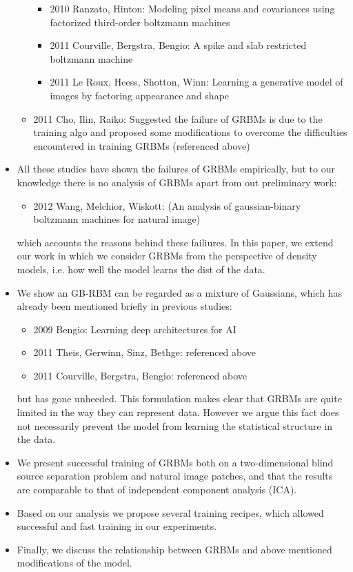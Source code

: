 \documentclass[twoside,english]{uiofysmaster}
\begin{document}
\begin{itemize}
\begin{itemize}
\begin{itemize}
			\item 2010 Ranzato, Hinton: Modeling pixel means and covariances using factorized third-order boltzmann machines \cite{Ranzato2010a}
			\item 2011 Courville, Bergstra, Bengio: A spike and slab restricted boltzmann machine \cite{Courville2011}
			\item 2011 Le Roux, Heess, Shotton, Winn: Learning a generative model of images by factoring appearance and shape \cite{LeRoux2011}
		\end{itemize}
		\item 2011 Cho, Ilin, Raiko: Suggested the failure of GRBMs is due to the training algo and proposed some modifications to overcome the difficulties encountered in training GRBMs (referenced above) \cite{Cho2011}
	\end{itemize}
	\item All these studies have shown the failures of GRBMs empirically, but to our knowledge there is no analysis of GRBMs apart from out preliminary work:
	\begin{itemize}
		\item 2012 Wang, Melchior, Wiskott: (An analysis of gaussian-binary boltzmann machines for natural image) \cite{Wang2012}
	\end{itemize}
	which accounts the reasons behind these failiures. In this paper, we extend our work in which we consider GRBMs from the perspective of density models, i.e. how well the model learns the dist of the data.
	\item We show an GB-RBM can be regarded as a mixture of Gaussians, which has already been mentioned briefly in previous studies:
	\begin{itemize}
		\item 2009 Bengio: Learning deep architectures for AI \cite{Bengio2009}
		\item 2011 Theis, Gerwinn, Sinz, Bethge: referenced above \cite{Theis2011}
		\item 2011 Courville, Bergstra, Bengio: referenced above \cite{Courville2011}
	\end{itemize}
	but has gone unheeded. This formulation makes clear that GRBMs are quite limited in the way they can represent data. However we argue this fact does not necessarily prevent the model from learning the statistical structure in the data. 
	\item We present successful training of GRBMs both on a two-dimensional blind source separation problem and natural image patches, and that the results are comparable to that of independent component analysis (ICA). 
	\item Based on our analysis we propose several training recipes, which allowed successful and fast training in our experiments. 
	\item Finally, we discuss the relationship between GRBMs and above mentioned modifications of the model.
\end{itemize}
\end{document}
